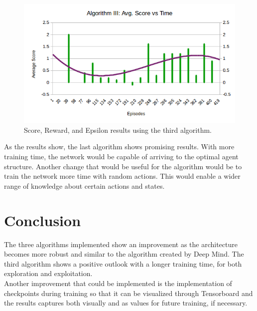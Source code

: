 \documentclass{article}
\begin{document}
\begin{enumerate}
\begin{figure}[H]
        \includegraphics[width=.8\textwidth]{Algorithm3_Avgscore.png}\hfill 
        \caption{Score, Reward, and Epsilon results using the third algorithm.}
    \end{figure}
    
    As the results show, the last algorithm shows promising results. With more training time, the network would be capable of arriving to the optimal agent structure. Another change that would be useful for the algorithm would be to train the network more time with random actions. This would enable a wider range of knowledge about certain actions and states.
    
\end{enumerate}

\section{Conclusion}
The three algorithms implemented show an improvement as the architecture becomes more robust and similar to the algorithm created by Deep Mind. The third algorithm shows a positive outlook with a longer training time, for both exploration and exploitation. \\

Another improvement that could be implemented is the implementation of checkpoints during training so that it can be visualized through Tensorboard and the results captures both visually and as values for future training, if necessary. 
\end{document}
